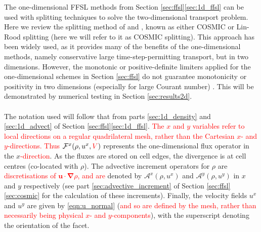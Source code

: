 \documentclass{ametsocV6.1}
\newcommand{\change}[1]{\textcolor{red}{#1}}
\begin{document}
The one-dimensional FFSL methods from Section \ref{sec:ffsl}\ref{sec:1d_ffsl} can be used with splitting techniques to solve the two-dimensional transport problem. Here we review the splitting method of \citet{leonard1996cosmic} and \citet{lin1996ffsl}, known as either COSMIC or Lin-Rood splitting (here we will refer to it as COSMIC splitting). This approach has been widely used, as it provides many of the benefits of the one-dimensional methods, namely conservative large time-step-permitting transport, but in two dimensions. However, the monotonic or positive-definite limiters applied for the one-dimensional schemes in Section \ref{sec:ffsl} do not guarantee monotonicity or positivity in two dimensions (especially for large Courant number) \citep{lin1996ffsl,leonard1996cosmic}.
This will be demonstrated by numerical testing in Section \ref{sec:results2d}. \\ 
\\
The notation used will follow that from parts \ref{sec:1d_density} and \ref{sec:1d_advect} of Section \ref{sec:ffsl}\ref{sec:1d_ffsl}. 
\change{The $x$ and $y$ variables refer to local directions on a regular quadrilateral mesh, rather than the Cartesian $x$- and $y$-directions. Thus}
$\mathcal{F}^x(\rho,u^x,\change{V})$ represents the one-dimensional flux operator in the $x$\change{-direction}. 
As the fluxes are stored on cell edges, the divergence is at cell centres (co-located with $\rho$).
The advective increment operators for $\rho$ are \change{discretisations of $\bm{u\cdot\nabla}\rho$, and are} denoted by $\mathcal{A}^x(\rho,u^x)$ and $\mathcal{A}^y(\rho,u^y)$ in $x$ and $y$ respectively  (see part \ref{sec:advective_increment} of Section \ref{sec:ffsl}\ref{sec:cosmic} for the calculation of these increments).
Finally, the velocity fields $u^x$ and $u^y$ are given by \eqref{eqn:u_normal} (\change{and so are defined by the mesh, rather than necessarily being physical $x$- and $y$-components}), with the superscript denoting the orientation of the facet.
\end{document}
